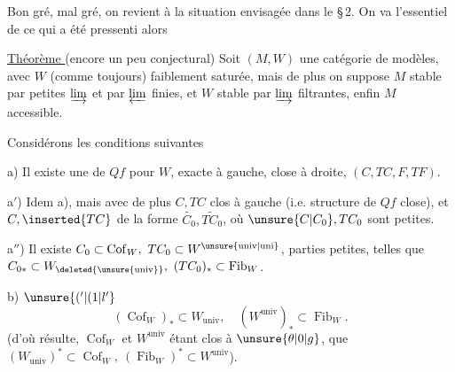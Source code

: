 Bon gré, mal gré, on revient à la situation envisagée dans le \S\,2. On va  l'essentiel de ce qui a été pressenti alors

\uline{Théorème } (encore un peu conjectural) Soit $(M,W)$ une catégorie de modèles, avec $W$ (comme toujours) faiblement saturée, mais de plus on suppose $M$ stable par petites $\varinjlim$ et par $\varprojlim$ finies, et $W$ stable par $\varinjlim$ filtrantes, enfin $M$ accessible.

Considérons les conditions suivantes

a) Il existe une  de $Qf$ pour $W$, exacte à gauche, close à droite, $(C,TC,F,TF)$.

a$'$) Idem a), mais avec  de plus $C,TC$ clos à gauche (i.e.  structure de $Qf$ close), et  $C,\inserted{TC}$ de la forme $\widetilde{C_{0}},\widetilde{TC_{0}}$, où $\unsure{C|C_{0}},TC_{0}$ sont petites.

a$''$) Il existe $C_{0}\subset\operatorname{Cof}_{W},\ TC_{0}\subset W^{\unsure{\mathrm{univ}|\mathrm{uni}}}$, parties petites, telles que $C_{0*}\subset W_{\deleted{\unsure{\mathrm{univ}}}},\ (TC_{0})_{*}\subset\operatorname{Fib}_{W}$.

b)  \(\unsure{('|(1|l'}\)
\[
 (\operatorname{Cof}_{W})_{*}\subset W_{\mathrm{univ}},\quad(W^{\mathrm{univ}})_{*}\subset\operatorname{Fib}_{W}.
\]
(d'où résulte, $\operatorname{Cof}_{W}$ et $W^{\mathrm{univ}}$ étant clos à $\unsure{\theta|0|g}$, que $(W_{\mathrm{univ}})^{*}\subset\operatorname{Cof}_{W},\ (\operatorname{Fib}_{W})^{*}\subset W^{\mathrm{univ}}$).

